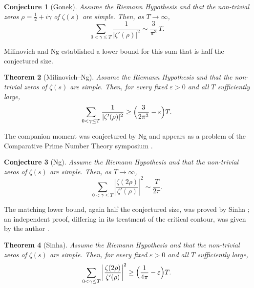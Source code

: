 \documentclass[12pt,a4paper,reqno]{amsart}
\newtheorem{theorem}{Theorem}
\newtheorem{conjecture}[theorem]{Conjecture}
\theoremstyle{remark}
\numberwithin{equation}{section}
\begin{document}
\begin{conjecture}[Gonek]\label{conj:gonek}
Assume the Riemann Hypothesis and that the non-trivial zeros $\rho=\tfrac12+i\gamma$ of $\zeta(s)$ are simple. Then, as $T\to\infty$,
\[
\sum_{0<\gamma\le T}\frac{1}{|\zeta'(\rho)|^2}\sim\frac{3}{\pi^3}\,T.
\]
\end{conjecture}

Milinovich and Ng \cite{MilinovichNg} established a lower bound for this sum that is half the conjectured size.

\begin{theorem}[Milinovich--Ng]\label{thm:MNzeta}
Assume the Riemann Hypothesis and that the non-trivial zeros of $\zeta(s)$ are simple. Then, for every fixed $\varepsilon>0$ and all $T$ sufficiently large,
\[
\sum_{0<\gamma\le T}\frac{1}{|\zeta'(\rho)|^2}\ge\Bigl(\frac{3}{2\pi^3}-\varepsilon\Bigr)T.
\]
\end{theorem}

The companion moment was conjectured by Ng \cite{NgThesis,NgPNET} and appears as a problem of the Comparative Prime Number Theory symposium \cite{CPNT}.

\begin{conjecture}[Ng]\label{conj:ng}
Assume the Riemann Hypothesis and that the non-trivial zeros of $\zeta(s)$ are simple. Then, as $T\to\infty$,
\[
\sum_{0<\gamma\le T}\left|\frac{\zeta(2\rho)}{\zeta'(\rho)}\right|^2\sim\frac{T}{2\pi}.
\]
\end{conjecture}

The matching lower bound, again half the conjectured size, was proved by Sinha \cite{SinhaThesis}; an independent proof, differing in its treatment of the critical contour, was given by the author \cite{PCNg}.

\begin{theorem}[Sinha]\label{thm:Sinha}
Assume the Riemann Hypothesis and that the non-trivial zeros of $\zeta(s)$ are simple. Then, for every fixed $\varepsilon>0$ and all $T$ sufficiently large,
\[
\sum_{0<\gamma\le T}\left|\frac{\zeta(2\rho)}{\zeta'(\rho)}\right|^2\ge\Bigl(\frac{1}{4\pi}-\varepsilon\Bigr)T.
\]
\end{theorem}
\end{document}
